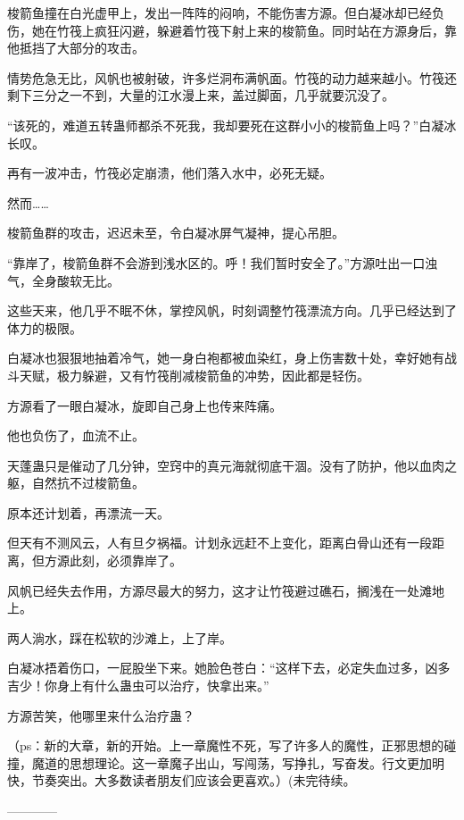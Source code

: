 \begin{this_body}
梭箭鱼撞在白光虚甲上，发出一阵阵的闷响，不能伤害方源。但白凝冰却已经负伤，她在竹筏上疯狂闪避，躲避着竹筏下射上来的梭箭鱼。同时站在方源身后，靠他抵挡了大部分的攻击。

情势危急无比，风帆也被射破，许多烂洞布满帆面。竹筏的动力越来越小。竹筏还剩下三分之一不到，大量的江水漫上来，盖过脚面，几乎就要沉没了。

“该死的，难道五转蛊师都杀不死我，我却要死在这群小小的梭箭鱼上吗？”白凝冰长叹。

再有一波冲击，竹筏必定崩溃，他们落入水中，必死无疑。

然而……

梭箭鱼群的攻击，迟迟未至，令白凝冰屏气凝神，提心吊胆。

“靠岸了，梭箭鱼群不会游到浅水区的。呼！我们暂时安全了。”方源吐出一口浊气，全身酸软无比。

这些天来，他几乎不眠不休，掌控风帆，时刻调整竹筏漂流方向。几乎已经达到了体力的极限。

白凝冰也狠狠地抽着冷气，她一身白袍都被血染红，身上伤害数十处，幸好她有战斗天赋，极力躲避，又有竹筏削减梭箭鱼的冲势，因此都是轻伤。

方源看了一眼白凝冰，旋即自己身上也传来阵痛。

他也负伤了，血流不止。

天蓬蛊只是催动了几分钟，空窍中的真元海就彻底干涸。没有了防护，他以血肉之躯，自然抗不过梭箭鱼。

原本还计划着，再漂流一天。

但天有不测风云，人有旦夕祸福。计划永远赶不上变化，距离白骨山还有一段距离，但方源此刻，必须靠岸了。

风帆已经失去作用，方源尽最大的努力，这才让竹筏避过礁石，搁浅在一处滩地上。

两人淌水，踩在松软的沙滩上，上了岸。

白凝冰捂着伤口，一屁股坐下来。她脸色苍白：“这样下去，必定失血过多，凶多吉少！你身上有什么蛊虫可以治疗，快拿出来。”

方源苦笑，他哪里来什么治疗蛊？

（ps：新的大章，新的开始。上一章魔性不死，写了许多人的魔性，正邪思想的碰撞，魔道的思想理论。这一章魔子出山，写闯荡，写挣扎，写奋发。行文更加明快，节奏突出。大多数读者朋友们应该会更喜欢。）(未完待续。

------------

\end{this_body}

